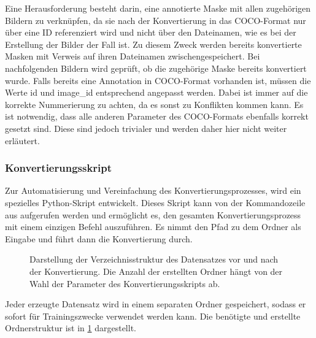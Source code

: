 Eine Herausforderung besteht darin, eine annotierte Maske mit allen zugehörigen Bildern zu verknüpfen, da sie nach der Konvertierung in das COCO-Format nur über eine ID referenziert wird und nicht über den Dateinamen, wie es bei der Erstellung der Bilder der Fall ist. Zu diesem Zweck werden bereits konvertierte Masken mit Verweis auf ihren Dateinamen zwischengespeichert. Bei nachfolgenden Bildern wird geprüft, ob die zugehörige Maske bereits konvertiert wurde. Falls bereits eine Annotation in COCO-Format vorhanden ist, müssen die Werte \glqq id\grqq{} und \glqq image\_id\grqq{} entsprechend angepasst werden. Dabei ist immer auf die korrekte Nummerierung zu achten, da es sonst zu Konflikten kommen kann.
Es ist notwendig, dass alle anderen Parameter des COCO-Formats ebenfalls korrekt gesetzt sind. Diese sind jedoch trivialer und werden daher hier nicht weiter erläutert.

\subsubsection{Konvertierungsskript}
Zur Automatisierung und Vereinfachung des Konvertierungsprozesses, wird ein spezielles Python-Skript entwickelt. Dieses Skript kann von der Kommandozeile aus aufgerufen werden und ermöglicht es, den gesamten Konvertierungsprozess mit einem einzigen Befehl auszuführen. Es nimmt den Pfad zu dem Ordner als Eingabe und führt dann die Konvertierung durch.
\begin{figure}[h]
\centering
\begin{minipage}{0.4\linewidth}
\end{minipage}
    \caption{Darstellung der Verzeichnisstruktur des Datensatzes vor und nach der Konvertierung. Die Anzahl der erstellten Ordner hängt von der Wahl der Parameter des Konvertierungsskripts ab.}
    \label{fig:folderstruc}
\end{figure}

Jeder erzeugte Datensatz wird in einem separaten Ordner gespeichert, sodass er sofort für Trainingszwecke verwendet werden kann. Die benötigte und erstellte Ordnerstruktur ist in \ref{fig:folderstruc} dargestellt.

